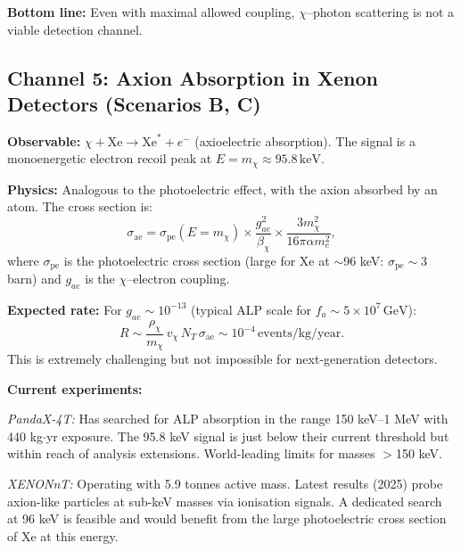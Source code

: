 \documentclass[12pt,a4paper]{article}
\newcommand{\keV}{\,\mathrm{keV}}
\newcommand{\GeV}{\,\mathrm{GeV}}
\begin{document}
\textbf{Bottom line:} Even with maximal allowed coupling,
$\chi$--photon scattering is not a viable detection channel.

\begin{center}
\end{center}

\subsection{Channel 5: Axion Absorption in Xenon Detectors (Scenarios B, C)}
\label{sec:absorption}

\textbf{Observable:} $\chi + \mathrm{Xe} \to \mathrm{Xe}^* + e^-$
(axioelectric absorption). The signal is a monoenergetic electron recoil
peak at $E = m_\chi \approx 95.8\keV$.

\textbf{Physics:} Analogous to the photoelectric effect, with the axion
absorbed by an atom. The cross section is:
\begin{equation}
\sigma_\mathrm{ae} = \sigma_\mathrm{pe}(E = m_\chi)
\times \frac{g_{ae}^2}{\beta_\chi}
\times \frac{3 m_\chi^2}{16\pi\alpha m_e^2},
\end{equation}
where $\sigma_\mathrm{pe}$ is the photoelectric cross section
(large for Xe at $\sim$96 keV: $\sigma_\mathrm{pe} \sim 3$\,barn)
and $g_{ae}$ is the $\chi$--electron coupling.

\textbf{Expected rate:} For $g_{ae} \sim 10^{-13}$ (typical ALP scale
for $f_a \sim 5 \times 10^7\GeV$):
\begin{equation}
R \sim \frac{\rho_\chi}{m_\chi}\,v_\chi\,N_T\,\sigma_\mathrm{ae}
\sim 10^{-4}\,\text{events/kg/year.}
\end{equation}
This is extremely challenging but not impossible for next-generation
detectors.

\textbf{Current experiments:}

\emph{PandaX-4T:} Has searched for ALP absorption in the range
150 keV--1 MeV with 440 kg$\cdot$yr exposure. The 95.8 keV signal is
just below their current threshold but within reach of analysis
extensions. World-leading limits for masses $>$150 keV.

\emph{XENONnT:} Operating with 5.9 tonnes active mass. Latest results
(2025) probe axion-like particles at sub-keV masses via ionisation
signals. A dedicated search at 96 keV is feasible and would benefit
from the large photoelectric cross section of Xe at this energy.
\end{document}
